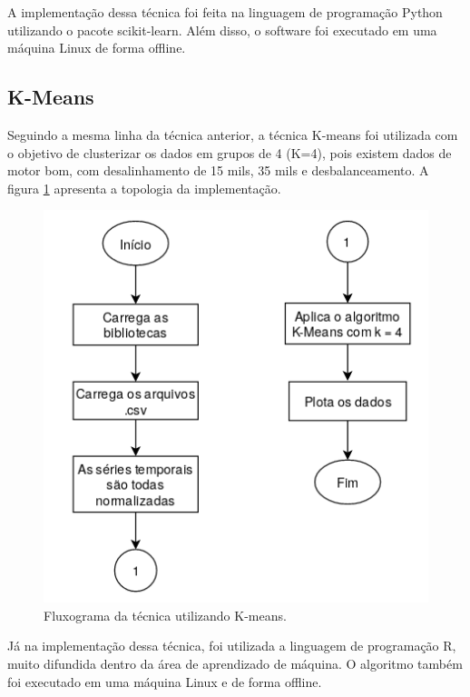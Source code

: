A implementação dessa técnica foi feita na linguagem de programação Python utilizando o pacote scikit-learn. Além disso, o software foi 
executado em uma máquina Linux de forma offline.


%  

\subsection{K-Means}

Seguindo a mesma linha da técnica anterior, a técnica K-means foi utilizada com o objetivo de clusterizar os dados em grupos de 4 
(K=4), pois existem dados de motor bom, com desalinhamento de 15 mils, 35 mils e desbalanceamento. A figura \ref{fig:k-means} apresenta
a topologia da implementação.


\begin{figure}[H]
    \caption{Fluxograma da técnica utilizando K-means.}
    \begin{center}
        \includegraphics[scale=.65]{metodologia/img/k-means.png}
    \end{center}
    \label{fig:k-means}
\end{figure}

Já na implementação dessa técnica, foi utilizada a linguagem de programação R, muito difundida dentro da área de aprendizado de máquina.
O algoritmo também foi executado em uma máquina Linux e de forma offline.


